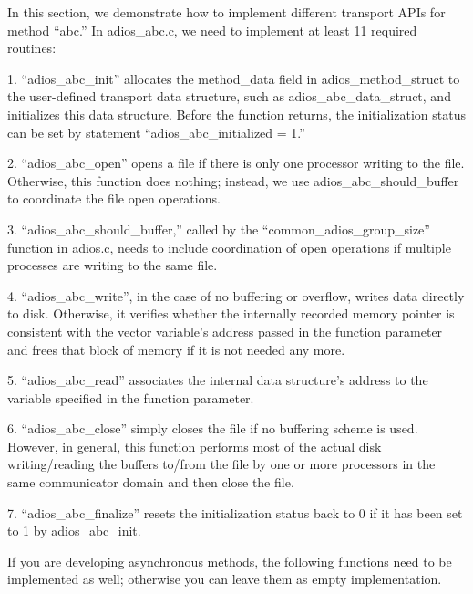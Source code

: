 \vspace{10pt}
In this section, we demonstrate how to implement different transport APIs for method 
``abc.'' In adios\_abc.c, we need to implement at least 11 required routines: 

\vspace{10pt}
1. ``adios\_abc\_init'' allocates the method\_data field in adios\_method\_struct 
to the user-defined transport data structure, such as adios\_abc\_data\_struct, 
and initializes this data structure. Before the function returns, the initialization 
status can be set by statement ``adios\_abc\_initialized = 1.''

\vspace{10pt}
2. ``adios\_abc\_open'' opens a file if there is only one processor writing to 
the file. Otherwise, this function does nothing; instead, we use adios\_abc\_should\_buffer 
to coordinate the file open operations.   

\vspace{10pt}
3. ``adios\_abc\_should\_buffer,'' called by the ``common\_adios\_group\_size'' 
function in adios.c, needs to include coordination of open operations if multiple 
processes are writing to the same file. 

\vspace{10pt}
4. ``adios\_abc\_write'', in the case of no buffering or overflow, writes data 
directly to disk. Otherwise, it verifies whether the internally recorded memory 
pointer is consistent with the vector variable's address passed in the function 
parameter and frees that block of memory if it is not needed any more.  

\vspace{10pt}
5. ``adios\_abc\_read'' associates the internal data structure's address to the 
variable specified in the function parameter.

\vspace{10pt}
6. ``adios\_abc\_close'' simply closes the file if no buffering scheme is used. 
However, in general, this function performs most of the actual disk writing/reading 
the buffers to/from the file by one or more processors in the same communicator 
domain and then close the file. 

\vspace{10pt}
7. ``adios\_abc\_finalize'' resets the initialization status back to 0 if it has 
been set to 1 by adios\_abc\_init. 

\vspace{10pt}
If you are developing asynchronous methods, the following functions need to be 
implemented as well; otherwise you can leave them as empty implementation.

